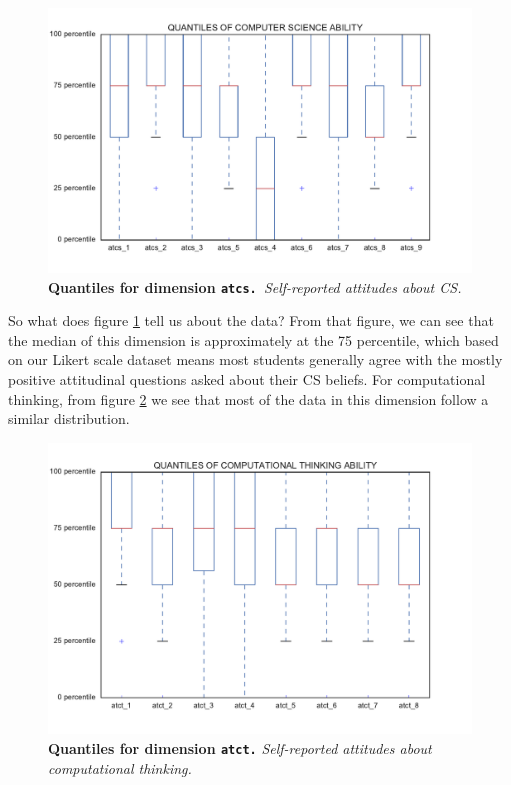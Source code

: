 \begin{figure}[!hbtp]
\centering
    \caption{\textbf{Quantiles for dimension \texttt{atcs. }}\textit{Self-reported attitudes about CS.}}\label{atcs_dimension}
    \includegraphics[width=1\textwidth]{figures/atcs_quantile}
\end{figure}

So what does figure \ref{atcs_dimension} tell us about the data? From that figure, we can see that the median of this dimension is approximately at the 75 percentile, which based on our Likert scale dataset means most students generally agree with the mostly positive attitudinal questions asked about their CS beliefs. For computational thinking, from figure \ref{atct_dimension} we see that most of the data in this dimension follow a similar distribution.
\begin{figure}[!hbtp]
\centering
    \caption{\textbf{Quantiles for dimension \texttt{atct.} }\textit{Self-reported attitudes about computational thinking.}}\label{atct_dimension}
    \includegraphics[width=1\textwidth]{figures/atct_quantile}
\end{figure}

